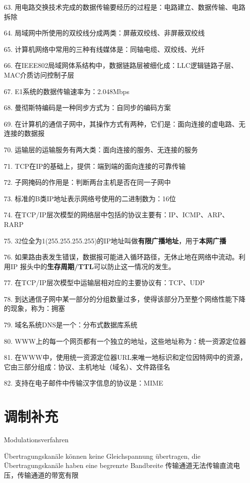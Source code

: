 \documentclass[fleqn]{article}
\begin{document}
63. 用电路交换技术完成的数据传输要经历的过程是：电路建立、数据传输、电路拆除

64. 局域网中所使用的双绞线分成两类：屏蔽双绞线、非屏蔽双绞线

65. 计算机网络中常用的三种有线媒体是：同轴电缆、双绞线、光纤

66. 在IEEE802局域网体系结构中，数据链路层被细化成：LLC逻辑链路子层、MAC介质访问控制子层

67. E1系统的数据传输速率为：2.048Mbps

68. 曼彻斯特编码是一种同步方式为：自同步的编码方案

69. 在计算机的通信子网中，其操作方式有两种，它们是：面向连接的虚电路、无连接的数据报

70. 运输层的运输服务有两大类：面向连接的服务、无连接的服务

71. TCP在IP的基础上，提供：端到端的面向连接的可靠传输

72. 子网掩码的作用是：判断两台主机是否在同一子网中

73. 标准的B类IP地址表示网络号使用的二进制数为：16位

74. 在TCP/IP层次模型的网络层中包括的协议主要有：IP、ICMP、ARP、RARP

75. 32位全为1(255.255.255.255)的IP地址叫做{\bfseries 有限广播地址}，用于{\bfseries 本网广播}

76. 如果路由表发生错误，数据报可能进入循环路径，无休止地在网络中流动。利用IP 报头中的{\bfseries 生存周期/TTL}可以防止这一情况的发生。

77. 在TCP/IP层次模型中运输层相对应的主要协议有：TCP、UDP

78. 到达通信子网中某一部分的分组数量过多，使得该部分乃至整个网络性能下降的现象，称为：拥塞

79. 域名系统DNS是一个：分布式数据库系统

80. WWW上的每一个网页都有一个独立的地址，这些地址称为：统一资源定位器

81. 在WWW中，使用统一资源定位器URL来唯一地标识和定位因特网中的资源，它由三部分组成：协议、主机地址（域名）、文件路径名

82. 支持在电子邮件中传输汉字信息的协议是：MIME

\clearpage
\section{调制补充}

 Modulationsverfahren

Übertragungskanäle können keine Gleichspannung übertragen, die Übertragungskanäle haben eine begrenzte Bandbreite
传输通道无法传输直流电压，传输通道的带宽有限
\end{document}
